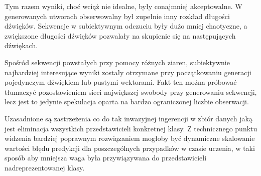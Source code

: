 {{        %





        Tym razem wyniki, choć wciąż nie idealne, były conajmniej akceptowalne. W generowanych utworach
        obserwowalny był zupełnie inny rozkład długości dźwięków. Sekwencje w subiektywnym odczuciu były dużo mniej
        chaotyczne, a zwiększone długości dźwięków pozwalały na skupienie się na następujących dźwiękach.
        
        Spośród sekwencji powstałych przy pomocy różnych ziaren, subiektywnie najbardziej interesujące wyniki
        zostały otrzymane przy początkowaniu generacji pojedynczym dźwiękiem lub pustymi wektorami.
        Fakt ten można próbować tłumaczyć pozostawieniem sieci największej swobody przy generowaniu sekwencji, lecz
        jest to jedynie spekulacja oparta na bardzo ograniczonej liczbie obserwacji.

        Uzasadnione są zastrzeżenia co do tak inwazyjnej ingerencji w zbiór danych jaką jest eliminacja 
        wszystkich przedstawicieli konkretnej klasy. Z technicznego punktu widzenia bardziej poprawnym 
        rozwiązaniem mogłoby być dynamiczne skalowanie wartości błędu predykcji dla poszczególnych przypadków w czasie uczenia, 
        w taki sposób aby mniejsza waga była przywiązywana do przedstawicieli nadreprezentowanej klasy.
    }
}